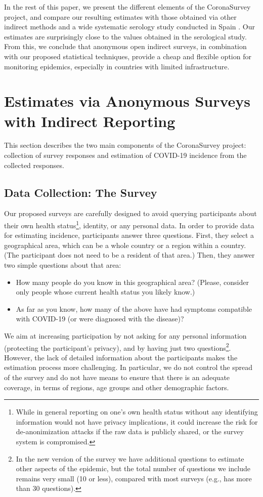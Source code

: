 \documentclass{article}
\begin{document}
In the rest of this paper, we present the different elements of the CoronaSurvey project, and compare our resulting estimates with those obtained via other indirect methods and a wide systematic serology study conducted in Spain \cite{ENEcovid19}. Our estimates are surprisingly close to the values obtained in the serological study. From this, we conclude that  
anonymous open indirect surveys, in combination with our proposed statistical techniques, provide a cheap and flexible option for monitoring
epidemics, especially in countries with limited infrastructure.

\section{Estimates via Anonymous Surveys with Indirect Reporting}

This section describes the two main components of the CoronaSurvey project: collection of survey responses and estimation of COVID-19 incidence from the collected responses.

\subsection{Data Collection: The Survey}

Our proposed surveys are carefully designed to avoid querying participants about their own health status\footnote{While in general reporting on one's own health status without any identifying information would not have privacy implications, it could increase the risk for de-anonimization attacks if the raw data is publicly shared, or the survey system is compromised.}, identity, or any personal data. In order to provide data for estimating incidence, participants answer three questions. First, they select a geographical area, which can be a whole country or a region within a country. (The participant does not need to be a resident of that area.)  Then, they answer two simple questions about that area: 
\begin{itemize}
\item How many people do you know in this geographical area? (Please, consider only people whose current health status you likely know.)
\item As far as you know, how many of the above have had symptoms compatible with COVID-19 (or were diagnosed with the disease)?
\end{itemize}

We aim at increasing participation by not asking for any personal information (protecting the participant's privacy), and by having just two questions\footnote{In the new version of the survey we have additional questions to estimate other aspects of the epidemic, but the total number of questions we include remains very small (10 or less), compared with most surveys (e.g., \cite{FB-survey} has more than 30 questions).}. However, the lack of detailed information about the participants makes the estimation process more challenging. In particular, we do not control the spread of the survey and do not have means to ensure that there is an adequate coverage, in terms of regions, age groups and other demographic factors. 
\end{document}
